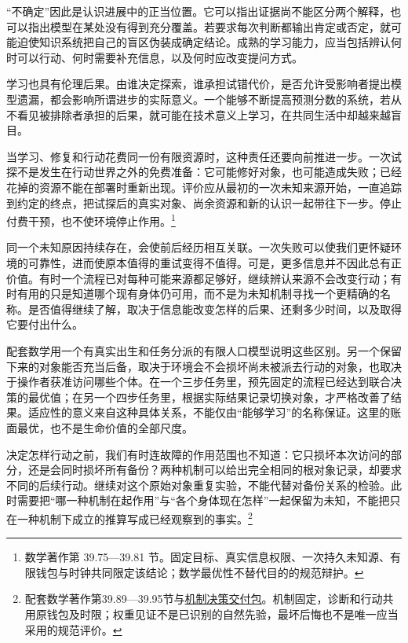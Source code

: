 \documentclass[
  11pt,
  oneside]{book}
\begin{document}
``不确定''因此是认识进展中的正当位置。它可以指出证据尚不能区分两个解释，也可以指出模型在某处没有得到充分覆盖。若要求每次判断都输出肯定或否定，就可能迫使知识系统把自己的盲区伪装成确定结论。成熟的学习能力，应当包括辨认何时可以行动、何时需要补充信息，以及何时应改变提问方式。

学习也具有伦理后果。由谁决定探索，谁承担试错代价，是否允许受影响者提出模型遗漏，都会影响所谓进步的实际意义。一个能够不断提高预测分数的系统，若从不看见被排除者承担的后果，就可能在技术意义上学习，在共同生活中却越来越盲目。

当学习、修复和行动花费同一份有限资源时，这种责任还要向前推进一步。一次试探不是发生在行动世界之外的免费准备：它可能修好对象，也可能造成失败；已经花掉的资源不能在部署时重新出现。评价应从最初的一次未知来源开始，一直追踪到约定的终点，把试探后的真实对象、尚余资源和新的认识一起带往下一步。停止付费干预，也不使环境停止作用。\footnote{\hypertarget{ph-note-26}{}数学著作第 39.75---39.81 节。固定目标、真实信息权限、一次持久未知源、有限钱包与时钟共同限定该结论；数学最优性不替代目的的规范辩护。}

同一个未知原因持续存在，会使前后经历相互关联。一次失败可以使我们更怀疑环境的可靠性，进而使原本值得的重试变得不值得。可是，更多信息并不因此总有正价值。有时一个流程已对每种可能来源都足够好，继续辨认来源不会改变行动；有时有用的只是知道哪个现有身体仍可用，而不是为未知机制寻找一个更精确的名称。是否值得继续了解，取决于信息能改变怎样的后果、还剩多少时间，以及取得它要付出什么。

配套数学用一个有真实出生和任务分派的有限人口模型说明这些区别。另一个保留下来的对象能否充当后备，取决于环境会不会损坏尚未被派去行动的对象，也取决于操作者获准访问哪些个体。在一个三步任务里，预先固定的流程已经达到联合决策的最优值；在另一个四步任务里，根据实际结果记录切换对象，才严格改善了结果。适应性的意义来自这种具体关系，不能仅由``能够学习''的名称保证。这里的账面最优，也不是生命价值的全部尺度。

决定怎样行动之前，我们有时连故障的作用范围也不知道：它只损坏本次访问的部分，还是会同时损坏所有备份？两种机制可以给出完全相同的根对象记录，却要求不同的后续行动。继续对这个原始对象重复实验，不能代替对备份关系的检验。此时需要把``哪一种机制在起作用''与``各个身体现在怎样''一起保留为未知，不能把只在一种机制下成立的推算写成已经观察到的事实。\footnote{\hypertarget{ph-note-27}{}配套数学著作第39.89---39.95节与\href{https://github.com/MurphyHoops/UEOT/blob/3d443ec29eb17af1fc00699a74e2d42d73516d81/formalization/ueot-core/docs/compression/theory_completion/unified_closure/mechanism_decision_closure_v1/README.md}{机制决策交付包}。机制固定，诊断和行动共用原钱包及时限；权重见证不是已识别的自然先验，最坏后悔也不是唯一应当采用的规范评价。}
\end{document}
